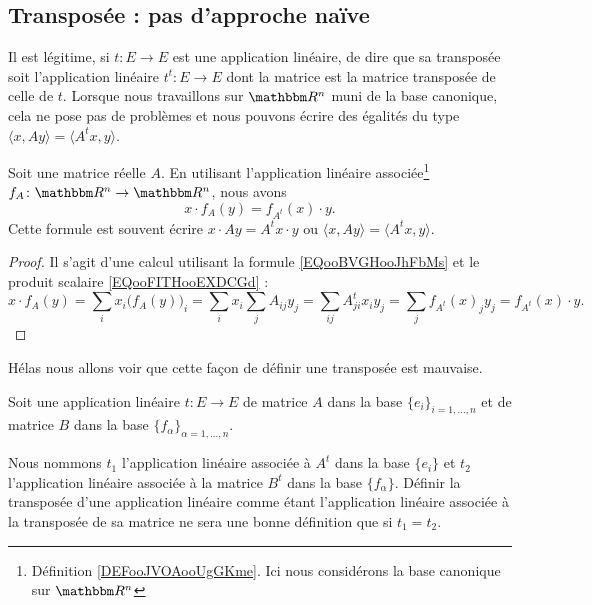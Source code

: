 \subsection{Transposée : pas d'approche naïve}
\label{SUBSECooGPXVooEYwIiJ}

Il est légitime, si \( t\colon E\to E\) est une application linéaire, de dire que sa transposée soit l'application linéaire \( t^t\colon E\to E\) dont la matrice est la matrice transposée de celle de \( t\). Lorsque nous travaillons sur \( \eR^n\) muni de la base canonique, cela ne pose pas de problèmes et nous pouvons écrire des égalités du type \( \langle x, Ay\rangle =\langle A^tx, y\rangle \).

\begin{proposition}     \label{PROPooNARVooEuhweD}
    Soit une matrice réelle \( A\). En utilisant l'application linéaire associée\footnote{Définition \ref{DEFooJVOAooUgGKme}. Ici nous considérons la base canonique sur \( \eR^n\)} \( f_A\colon \eR^n\to \eR^n\), nous avons
    \begin{equation}
        x\cdot f_A(y)=f_{A^t}(x)\cdot y.
    \end{equation}
    Cette formule est souvent écrire \( x\cdot Ay=A^tx\cdot y\) ou \( \langle x, Ay\rangle =\langle A^tx, y\rangle \).
\end{proposition}

\begin{proof}
    Il s'agit d'une calcul utilisant la formule \eqref{EQooBVGHooJhFbMs} et le produit scalaire \eqref{EQooFITHooEXDCGd} :
    \begin{equation}
        x\cdot f_A(y)=\sum_ix_i\big( f_A(y) \big)_i=\sum_ix_i\sum_jA_{ij}y_j=\sum_{ij}A^t_{ji}x_iy_j=\sum_jf_{A^t}(x)_jy_j=f_{A^t}(x)\cdot y.
    \end{equation}
\end{proof}

Hélas nous allons voir que cette façon de définir une transposée est mauvaise.

Soit une application linéaire \( t\colon E\to E\) de matrice \( A\) dans la base \( \{ e_i \}_{i=1,\ldots, n}\) et de matrice \( B\) dans la base \( \{ f_{\alpha} \}_{\alpha=1,\ldots, n}\).

Nous nommons \( t_1\) l'application linéaire associée à \( A^t\) dans la base \( \{ e_i \}\) et \( t_2\) l'application linéaire associée à la matrice \( B^t\) dans la base \( \{ f_{\alpha} \}\). Définir la transposée d'une application linéaire comme étant l'application linéaire associée à la transposée de sa matrice ne sera une bonne définition que si \( t_1=t_2\).

